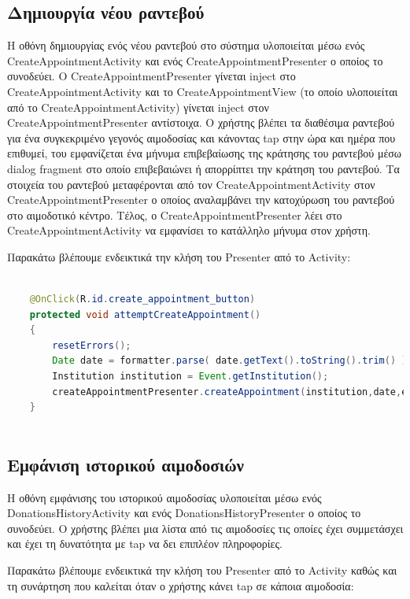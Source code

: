 	
\subsection{Δημιουργία νέου ραντεβού}	

	
   		Η οθόνη δημιουργίας ενός νέου ραντεβού στο σύστημα υλοποιείται μέσω ενός CreateAppointmentActivity και ενός CreateAppointmentPresenter ο οποίος το συνοδεύει. Ο CreateAppointmentPresenter γίνεται inject στο CreateAppointmentActivity και το CreateAppointmentView (το οποίο υλοποιείται από το CreateAppointmentActivity) γίνεται inject στον CreateAppointmentPresenter αντίστοιχα. O χρήστης βλέπει τα διαθέσιμα ραντεβού για ένα συγκεκριμένο γεγονός αιμοδοσίας και κάνοντας tap στην ώρα και ημέρα που επιθυμεί, του εμφανίζεται ένα μήνυμα επιβεβαίωσης της κράτησης του ραντεβού μέσω dialog fragment στο οποίο επιβεβαιώνει ή απορρίπτει την κράτηση του ραντεβού. Τα στοιχεία του ραντεβού μεταφέρονται από τον CreateAppointmentActivity στον CreateAppointmentPresenter ο οποίος αναλαμβάνει την κατοχύρωση του ραντεβού στο αιμοδοτικό κέντρο. Τέλος, ο CreateAppointmentPresenter λέει στο CreateAppointmentActivity να εμφανίσει το κατάλληλο μήνυμα στον χρήστη.
   
   		
   		Παρακάτω βλέπουμε ενδεικτικά την κλήση του Presenter από το Activity:
   			
   			
   	\begin{lstlisting}[language=Java]			
		
    @OnClick(R.id.create_appointment_button)
    protected void attemptCreateAppointment()
    {
        resetErrors();
        Date date = formatter.parse( date.getText().toString().trim() );
        Institution institution = Event.getInstitution();
        createAppointmentPresenter.createAppointment(institution,date,event);
    }
    
		\end{lstlisting}
		
\subsection{Εμφάνιση ιστορικού αιμοδοσιών}	

   		Η οθόνη εμφάνισης του ιστορικού αιμοδοσίας υλοποιείται μέσω ενός DonationsHistoryActivity και ενός DonationsHistoryPresenter ο οποίος το συνοδεύει. O χρήστης βλέπει μια λίστα από τις αιμοδοσίες τις οποίες έχει συμμετάσχει και έχει τη δυνατότητα με tap να δει επιπλέον πληροφορίες. 
   
   		Παρακάτω βλέπουμε ενδεικτικά την κλήση του Presenter από το Activity καθώς και τη συνάρτηση που καλείται όταν ο χρήστης κάνει tap σε κάποια αιμοδοσία:
   			
